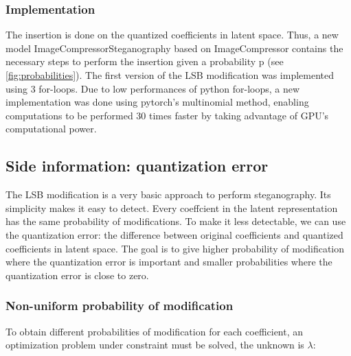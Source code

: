 \documentclass[12pt]{article}
\begin{document}
\subsubsection{Implementation}
The insertion is done on the quantized coefficients in latent space. Thus, a new model ImageCompressorSteganography based on ImageCompressor contains the necessary steps to perform the insertion given a probability p (see \autoref{fig:probabilities}). The first version of the LSB modification was implemented using 3 for-loops. Due to low performances of python for-loops, a new implementation was done using pytorch's multinomial method, enabling computations to be performed 30 times faster by taking advantage of GPU's computational power.

\subsection{Side information: quantization error}
The LSB modification is a very basic approach to perform steganography. Its simplicity makes it easy to detect. Every coeffcient in the latent representation has the same probability of modifications. To make it less detectable, we can use the quantization error: the difference between original coefficients and quantized coefficients in latent space. The goal is to give higher probability of modification where the quantization error is important and smaller probabilities where the quantization error is close to zero.  
\subsubsection{Non-uniform probability of modification}
To obtain different probabilities of modification for each coefficient, an optimization problem under constraint must be solved, the unknown is $\lambda$:
\end{document}

